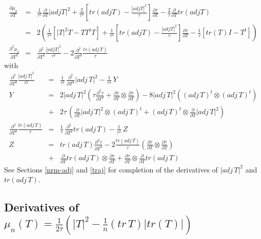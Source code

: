 \documentclass{report}
\begin{document}
\begin{eqnarray}
\frac{\partial \mu_3}{\partial T} &=& 
  \frac{1}{\tau^2}\frac{\partial}{\partial T}|adj T|^2 +
  \frac{2}{\tau^2}\left[ tr(adj T) - \frac{|adj T|^2}{\tau}\right ] \frac{\partial \tau}{\partial T} -
  \frac{2}{\tau}\frac{\partial}{\partial T} tr(adj T) \\
  & = & \nonumber 2 \left( 
  \frac{1}{\tau^2}\left[ |T|^2 T - T T^t T \right] +
  \frac{1}{\tau^2}\left[ tr(adj T) - \frac{|adj T|^2}{\tau}\right ] \frac{\partial \tau}{\partial T} -
  \frac{1}{\tau}\left[ tr(T) I - T^t \right] \right) \\
\frac{\partial^2 \mu_3}{\partial T^2} &=& \frac{\partial^2}{\partial T^2} \frac{|adj T|^2}{\tau^2} - 2 \frac{\partial^2}{\partial T^2} \frac{tr(adj \, T)}{\tau}
\end{eqnarray}
with
\begin{eqnarray}
\frac{\partial^2}{\partial T^2} \frac{|adj \, T|^2}{\tau^2} & = & \frac{1}{\tau^2} \, \frac{\partial^2}{\partial T^2} |adj \, T|^2 - \frac{1}{\tau^4} \, Y \label{adj-frac} \\
Y & = & 2 |adj \, T|^2 \left( \tau \frac{\partial^2 \tau}{\partial T^2} + \frac{\partial \tau}{\partial T} \otimes \frac{\partial \tau}{\partial T} \right) - 8 |adj \, T|^2 \left( (adj \, T)^t \otimes (adj \, T)^t \right) \nonumber \label{yadj-frac} \\
 & + & 2 \tau \, \left( \frac{\partial}{\partial T} |adj \, T|^2 \otimes (adj \, T)^t + (adj \, T)^t \otimes  \frac{\partial}{\partial T} |adj \, T|^2 \right) \\
\frac{\partial^2}{\partial T^2} \frac{tr(adj \, T)}{\tau} & = & \frac{1}{\tau} \, \frac{\partial^2}{\partial T^2} tr(adj \, T) - \frac{1}{\tau^2} \, Z \\
Z & = & tr(adj \, T) \frac{\partial^2 \tau}{\partial T^2} - 2 \frac{tr(adj \, T)}{\tau} \left( \frac{\partial \tau}{\partial T} \otimes  \frac{\partial \tau}{\partial T} \right) \nonumber \\
 & + & \frac{\partial}{\partial T} tr(adj \, T) \otimes \frac{\partial \tau}{\partial T} + \frac{\partial \tau}{\partial T} \otimes  \frac{\partial}{\partial T} tr(adj \, T)
\end{eqnarray}
See Sections \ref{nrm-adj} and \ref{traj} for completion of the derivatives of 
$|adj \, T|^2$ and $tr(adj \, T)$. \newline

\subsection{Derivatives of $\mu_n(T) = \frac{1}{2\tau} \left( |T|^2 - \frac{1}{n} (tr \, T) |tr(T)| \right)$ \label{nu-over-tau}}
\end{document}
